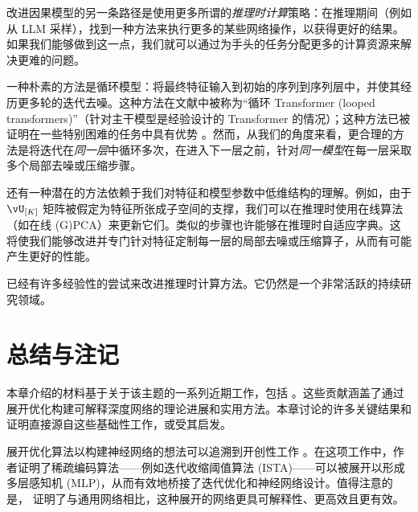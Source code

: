\documentclass[../../book-main_zh.tex]{subfiles}
\begin{document}
\begin{example}[推理时计算策略]
    改进因果模型的另一条路径是使用更多所谓的\textit{推理时计算}策略：在推理期间（例如从 LLM 采样），找到一种方法来执行更多的某些网络操作，以获得更好的结果。如果我们能够做到这一点，我们就可以通过为手头的任务分配更多的计算资源来解决更难的问题。

    一种朴素的方法是循环模型：将最终特征输入到初始的序列到序列层中，并使其经历更多轮的迭代去噪。这种方法在文献中被称为“循环 Transformer (looped transformers)”（针对主干模型是经验设计的 Transformer 的情况）；这种方法已被证明在一些特别困难的任务中具有优势 \citep{giannou2023looped,yang2023looped,saunshi2025reasoning}。然而，从我们的角度来看，更合理的方法是将迭代在\textit{同一层}中循环多次，在进入下一层之前，针对\textit{同一模型}在每一层采取多个局部去噪或压缩步骤。

    还有一种潜在的方法依赖于我们对特征和模型参数中低维结构的理解。例如，由于 \(\vU_{[K]}\) 矩阵被假定为特征所张成子空间的支撑，我们可以在推理时使用在线算法（如在线 (G)PCA）来更新它们。类似的步骤也许能够在推理时自适应字典。这将使我们能够改进并专门针对特征定制每一层的局部去噪或压缩算子，从而有可能产生更好的性能。

    已经有许多经验性的尝试来改进推理时计算方法。它仍然是一个非常活跃的持续研究领域。
\end{example}


\section{总结与注记}

本章介绍的材料基于关于该主题的一系列近期工作，包括 \cite{chan2021redunet,
wang2024global, wang2025attention, wu2025token, yu2023white}。这些贡献涵盖了通过展开优化构建可解释深度网络的理论进展和实用方法。本章讨论的许多关键结果和证明直接源自这些基础性工作，或受其启发。

展开优化算法以构建神经网络的想法可以追溯到开创性工作 \cite{gregor2010learning}。在这项工作中，作者证明了稀疏编码算法——例如迭代收缩阈值算法 (ISTA)——可以被展开以形成多层感知机 (MLP)，从而有效地桥接了迭代优化和神经网络设计。值得注意的是，\cite{monga2019algorithm} 证明了与通用网络相比，这种展开的网络更具可解释性、更高效且更有效。
\end{document}
